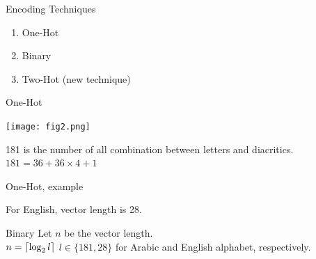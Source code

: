 \documentclass[10pt]{beamer}
\DeclarePairedDelimiter{\ceil}{\lceil}{\rceil}
\begin{document}
\begin{frame}[fragile]{Encoding Techniques}
\begin{enumerate}
    \item One-Hot
    \item Binary
    \item \alert{Two-Hot} (new technique)

\end{enumerate}
\end{frame}

\begin{frame}[fragile]{One-Hot}
    \begin{center}
        \texttt{[image: fig2.png]}
    \end{center}
181 is the number of all combination between letters and diacritics.\\
$181 = 36 + 36 \times 4 + 1$
\end{frame}

\begin{frame}[fragile]{One-Hot, example}
    \begin{center}
        
    \end{center}
For English, vector length is 28. 
\end{frame}

\begin{frame}[fragile]{Binary}
Let $n$ be the vector length.\\
$n = \ceil*{\log_2 l}$ $l \in \{181, 28\}$ for Arabic and English alphabet, respectively.   
    \begin{center}
        
    \end{center}
\end{frame}
\end{document}
